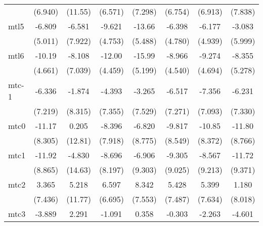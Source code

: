 \documentclass{article}
\begin{document}
{\begin{longtable}{l*{7}{c}}
                &  (6.940)         &  (11.55)         &  (6.571)         &  (7.298)         &  (6.754)         &  (6.913)         &  (7.838)         \\
mtl5            &   -6.809         &   -6.581         &   -9.621         &   -13.66\sym{*}  &   -6.398         &   -6.177         &   -3.083         \\
                &  (5.011)         &  (7.922)         &  (4.753)         &  (5.488)         &  (4.780)         &  (4.939)         &  (5.999)         \\
mtl6            &   -10.19\sym{*}  &   -8.108         &   -12.00\sym{*}  &   -15.99\sym{**} &   -8.966         &   -9.274         &   -8.355         \\
                &  (4.661)         &  (7.039)         &  (4.459)         &  (5.199)         &  (4.540)         &  (4.694)         &  (5.278)         \\
mtc-1           &   -6.336         &   -1.874         &   -4.393         &   -3.265         &   -6.517         &   -7.356         &   -6.231         \\
                &  (7.219)         &  (8.315)         &  (7.355)         &  (7.529)         &  (7.271)         &  (7.093)         &  (7.330)         \\
mtc0            &   -11.17         &    0.205         &   -8.396         &   -6.820         &   -9.817         &   -10.85         &   -11.80         \\
                &  (8.305)         &  (12.81)         &  (7.918)         &  (8.775)         &  (8.549)         &  (8.372)         &  (8.766)         \\
mtc1            &   -11.92         &   -4.830         &   -8.696         &   -6.906         &   -9.305         &   -8.567         &   -11.72         \\
                &  (8.865)         &  (14.63)         &  (8.197)         &  (9.303)         &  (9.025)         &  (9.213)         &  (9.371)         \\
mtc2            &    3.365         &    5.218         &    6.597         &    8.342         &    5.428         &    5.399         &    1.180         \\
                &  (7.436)         &  (11.77)         &  (6.695)         &  (7.553)         &  (7.487)         &  (7.634)         &  (8.018)         \\
mtc3            &   -3.889         &    2.291         &   -1.091         &    0.358         &   -0.303         &   -2.263         &   -4.601         \\

\end{longtable}}
\end{document}
